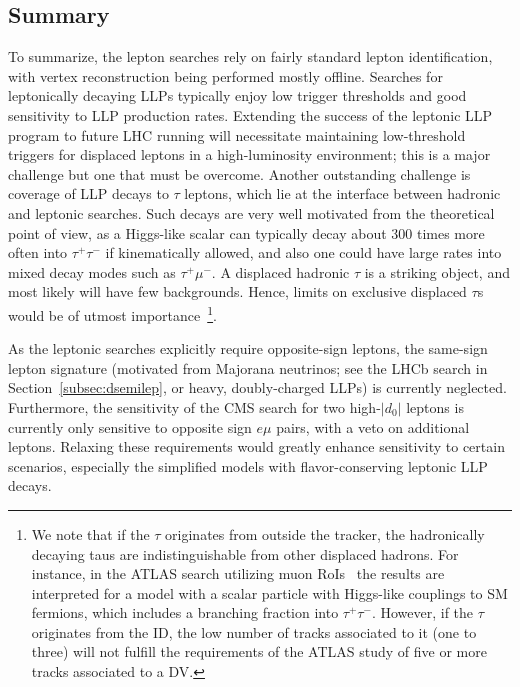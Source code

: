 \subsection{Summary}
\label{sec:leptonicsummary}

To summarize, the lepton searches rely on fairly standard lepton identification, with vertex reconstruction being performed mostly offline. Searches for leptonically decaying LLPs typically enjoy low trigger thresholds and good sensitivity to LLP production rates. Extending the success of the leptonic LLP program to future LHC running will necessitate maintaining low-threshold triggers for displaced leptons in a high-luminosity environment; this is a major challenge but one that must be overcome. Another outstanding challenge is coverage of LLP decays to $\tau$ leptons, which lie at the interface between hadronic and leptonic searches. Such decays are very well motivated from the theoretical point of view, as a Higgs-like scalar can typically decay about 300 times more often into $\tau^+ \tau^-$ if kinematically allowed, and also one could have large rates into mixed decay modes such as $\tau^+ \mu^-$. A displaced hadronic $\tau$ is a striking object, and most likely will have few backgrounds. Hence, limits on exclusive displaced $\tau$s would be of utmost importance~\footnote{We note that if the $\tau$ originates from outside the tracker, the hadronically decaying taus are indistinguishable from other displaced hadrons. For instance, in the ATLAS search utilizing muon RoIs~\cite{Aad:2015uaa} the results are interpreted for a model with a scalar particle with Higgs-like couplings to SM fermions, which includes a branching fraction into $\tau^+ \tau^-$. However, if the $\tau$ originates from the ID, the low number of tracks associated to it (one to three) will not fulfill the requirements of the ATLAS study of five or more tracks associated to a DV.}.

As the leptonic searches explicitly require opposite-sign leptons, the same-sign lepton signature (motivated from Majorana neutrinos; see the LHCb search in Section~\ref{subsec:dsemilep}, or heavy, doubly-charged LLPs) is currently neglected. Furthermore, the sensitivity of the CMS search for two high-$|d_0|$ leptons is currently only sensitive to opposite sign $e\mu$ pairs, with a veto on additional leptons. Relaxing these requirements would greatly enhance sensitivity to certain scenarios, especially the simplified models with flavor-conserving leptonic LLP decays.

